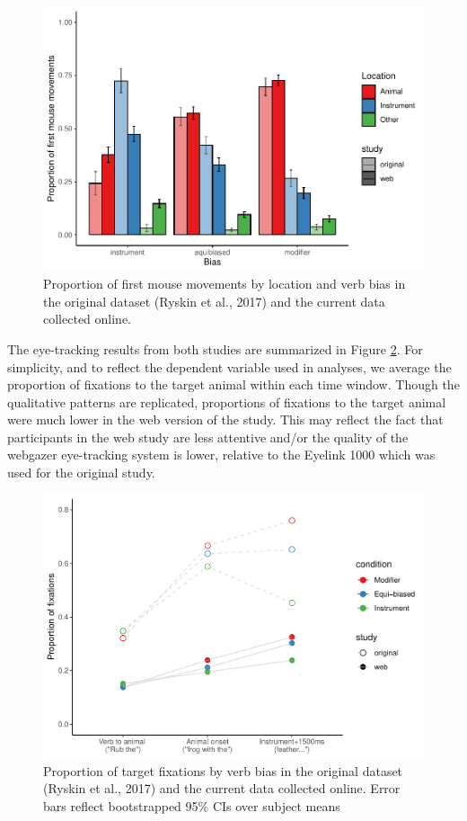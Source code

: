 \documentclass[
  man,floatsintext]{apa6}
\begin{document}
\begin{figure}
\centering
\includegraphics{manuscript_files/figure-latex/E4-mouse-moves-fig-web-and-orig-1.pdf}
\caption{\label{fig:E4-mouse-moves-fig-web-and-orig}Proportion of first mouse movements by location and verb bias in the original dataset (Ryskin et al., 2017) and the current data collected online.}
\end{figure}

The eye-tracking results from both studies are summarized in Figure \ref{fig:E4-proportion-fix-by-window-both}.
For simplicity, and to reflect the dependent variable used in analyses, we average the proportion of fixations to the target animal within each time window.
Though the qualitative patterns are replicated, proportions of fixations to the target animal were much lower in the web version of the study.
This may reflect the fact that participants in the web study are less attentive and/or the quality of the webgazer eye-tracking system is lower, relative to the Eyelink 1000 which was used for the original study.

\begin{figure}
\centering
\includegraphics{manuscript_files/figure-latex/E4-proportion-fix-by-window-both-1.pdf}
\caption{\label{fig:E4-proportion-fix-by-window-both}Proportion of target fixations by verb bias in the original dataset (Ryskin et al., 2017) and the current data collected online. Error bars reflect bootstrapped 95\% CIs over subject means}
\end{figure}
\end{document}
